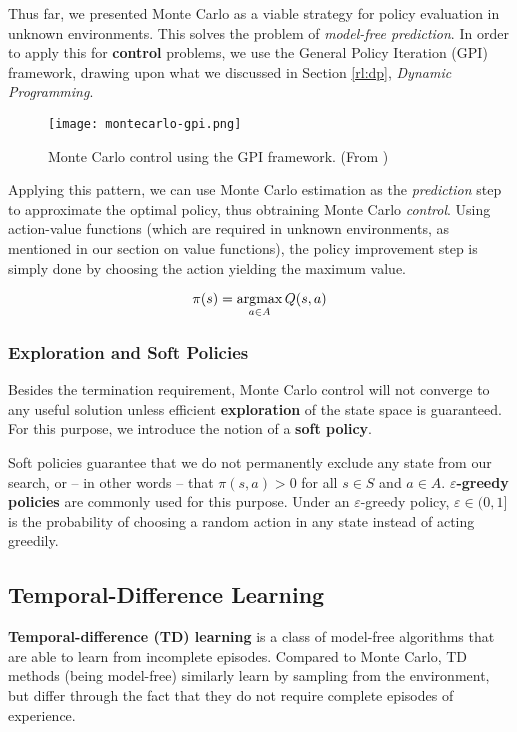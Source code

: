 Thus far, we presented Monte Carlo as a viable strategy for policy evaluation in unknown environments.
This solves the problem of \emph{model-free prediction}.
In order to apply this for \textbf{control} problems, we use the General Policy Iteration (GPI) framework, drawing upon what we discussed in Section \ref{rl:dp}, \emph{Dynamic Programming}.

\begin{figure}[h]
    \texttt{[image: montecarlo-gpi.png]}
    \centering
    \caption{Monte Carlo control using the GPI framework. (From \cite{rlai})}
\end{figure}

Applying this pattern, we can use Monte Carlo estimation as the \emph{prediction} step to approximate the optimal policy, thus obtraining Monte Carlo \emph{control}.
Using action-value functions (which are required in unknown environments, as mentioned in our section on value functions), the policy improvement step is simply done by choosing the action yielding the maximum value.

\begin{equation}
    \pi(s) = \operatorname*{\arg\!\max}_{a \in A}{Q(s, a)}
\end{equation}

\subsubsection{Exploration and Soft Policies}

Besides the termination requirement, Monte Carlo control will not converge to any useful solution unless efficient \textbf{exploration} of the state space is guaranteed.
For this purpose, we introduce the notion of a \textbf{soft policy}.

Soft policies guarantee that we do not permanently exclude any state from our search, or -- in other words -- that $\pi (s, a) > 0$ for all $s \in S$ and $a \in A$.
\textbf{$\varepsilon$-greedy policies} are commonly used for this purpose.
Under an $\varepsilon$-greedy policy, $\varepsilon \in (0, 1]$ is the probability of choosing a random action in any state instead of acting greedily.

\subsection{Temporal-Difference Learning} \label{rl:td}
\textbf{Temporal-difference (TD) learning} is a class of model-free algorithms that are able to learn from incomplete episodes.
Compared to Monte Carlo, TD methods (being model-free) similarly learn by sampling from the environment, but differ through the fact that they do not require complete episodes of experience.

